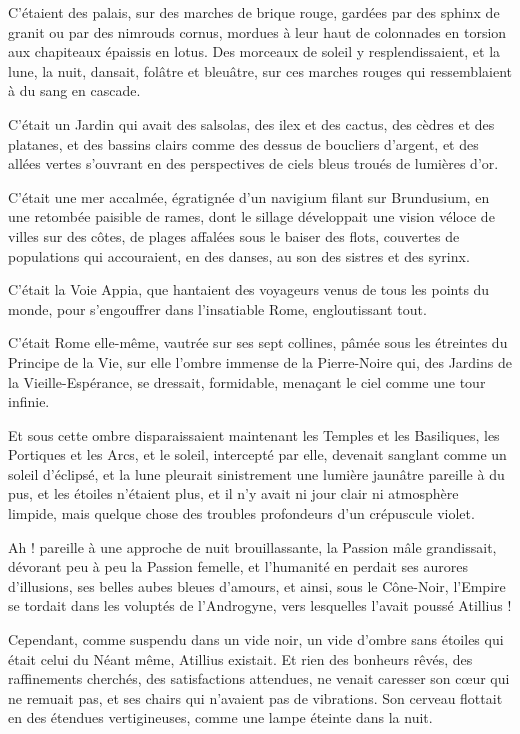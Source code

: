 \documentclass[a4paper, 11pt, oneside, polutonikogreek, french]{article}
\begin{document}
C'étaient des palais, sur des marches de brique rouge, gardées par des sphinx de granit ou par des nimrouds cornus, mordues à leur haut de colonnades en torsion aux chapiteaux épaissis en lotus. Des morceaux de soleil y resplendissaient, et la lune, la nuit, dansait, folâtre et bleuâtre, sur ces marches rouges qui ressemblaient à du sang en cascade.

C'était un Jardin qui avait des salsolas, des ilex et des cactus, des cèdres et des platanes, et des bassins clairs comme des dessus de boucliers d'argent, et des allées vertes s'ouvrant en des perspectives de ciels bleus troués de lumières d'or.

C'était une mer accalmée, égratignée d'un navigium filant sur Brundusium, en une retombée paisible de rames, dont le sillage développait une vision véloce de villes sur des côtes, de plages affalées sous le baiser des flots, couvertes de populations qui accouraient, en des danses, au son des sistres et des syrinx.

C'était la Voie Appia, que hantaient des voyageurs venus de tous les points du monde, pour s'engouffrer dans l'insatiable Rome, engloutissant tout.

C'était Rome elle-même, vautrée sur ses sept collines, pâmée sous les étreintes du Principe de la Vie, sur elle l'ombre immense de la Pierre-Noire qui, des Jardins de la Vieille-Espérance, se dressait, formidable, menaçant le ciel comme une tour infinie.

Et sous cette ombre disparaissaient maintenant les Temples et les Basiliques, les Portiques et les Arcs, et le soleil, intercepté par elle, devenait sanglant comme un soleil d'éclipsé, et la lune pleurait sinistrement une lumière jaunâtre pareille à du pus, et les étoiles n'étaient plus, et il n'y avait ni jour clair ni atmosphère limpide, mais quelque chose des troubles profondeurs d'un crépuscule violet.

Ah ! pareille à une approche de nuit brouillassante, la Passion mâle grandissait, dévorant peu à peu la Passion femelle, et l'humanité en perdait ses aurores d'illusions, ses belles aubes bleues d'amours, et ainsi, sous le Cône-Noir, l'Empire se tordait dans les voluptés de l’Androgyne, vers lesquelles l'avait poussé Atillius !

Cependant, comme suspendu dans un vide noir, un vide d'ombre sans étoiles qui était celui du Néant même, Atillius existait. Et rien des bonheurs rêvés, des raffinements cherchés, des satisfactions attendues, ne venait caresser son cœur qui ne remuait pas, et ses chairs qui n'avaient pas de vibrations. Son cerveau flottait en des étendues vertigineuses, comme une lampe éteinte dans la nuit.
\end{document}
